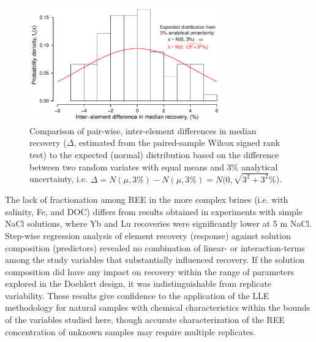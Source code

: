 \begin{figure}[htbp]
\begin{center}
\includegraphics[width=0.75\textwidth]{Ch4_figures/element-diff-hist.pdf}
\caption{Comparison of pair-wise, inter-element differences in median recovery ($\Delta$, estimated from the paired-sample Wilcox signed rank test) to the expected (normal) distribution based on the difference between two random variates with equal means and 3\% analytical uncertainty, i.e.
$\Delta = N(\mu, 3\%) - N(\mu, 3\%) = N(0,\sqrt{3^2 + 3^2 }\%$).}
\label{fig:element-diff-hist}
\end{center}
\end{figure}


The lack of fractionation among REE in the more complex brines (i.e. with salinity, Fe, and DOC) differs from results obtained in experiments with simple NaCl solutions, where Yb and Lu recoveries were significantly lower at 5 m NaCl.
Step-wise regression analysis of element recovery (response) against solution composition (predictors) revealed no combination of linear- or interaction-terms among the study variables that substantially influenced recovery.
If the solution composition did have any impact on recovery within the range of parameters explored in the Doehlert design, it was indistinguishable from replicate variability.
These results give confidence to the application of the LLE methodology for natural samples with chemical characteristics within the bounds of the variables studied here, though accurate characterization of the REE concentration of unknown samples may require multiple replicates.



